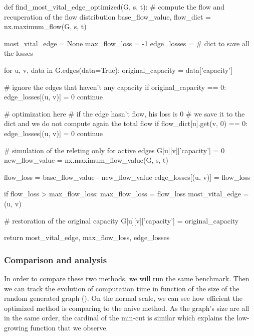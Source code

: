 \documentclass[12pt, openany]{article}
\begin{document}
\begin{python}[caption={Python code for the naive approach in order to identify the most vital edge},  label={lst:2_naive_method_lst}]
def find_most_vital_edge_optimized(G, s, t):
    # compute the flow and recuperation of the flow distribution
    base_flow_value, flow_dict = nx.maximum_flow(G, s, t)
    
    most_vital_edge = None
    max_flow_loss = -1
    edge_losses = {} # dict to save all the losses
    
    for u, v, data in G.edges(data=True):
        original_capacity = data['capacity']
        
        # ignore the edges that haven't any capacity
        if original_capacity == 0: 
            edge_losses[(u, v)] = 0
            continue
            
        # optimization here
        # if the edge hasn't flow, his loss is 0
        # we save it to the dict and we do not compute again the total flow
        if flow_dict[u].get(v, 0) == 0:
            edge_losses[(u, v)] = 0
            continue
            
        # simulation of the releting only for active edges
        G[u][v]['capacity'] = 0
        new_flow_value = nx.maximum_flow_value(G, s, t)
        
        flow_loss = base_flow_value - new_flow_value
        edge_losses[(u, v)] = flow_loss
        
        if flow_loss > max_flow_loss:
            max_flow_loss = flow_loss
            most_vital_edge = (u, v)
            
        # restoration of the original capacity
        G[u][v]['capacity'] = original_capacity
        
    return most_vital_edge, max_flow_loss, edge_losses
\end{python}

\subsubsection{Comparison and analysis}

In order to compare these two methods, we will run the same benchmark.
Then we can track the evolution of computation time in function of the size of the random generated graph (). On the normal scale, we can see how efficient the optimized method is comparing to the naive method. As the graph's size are all in the same order, the cardinal of the min-cut is similar which explains the low-growing function that we observe.
\end{document}
